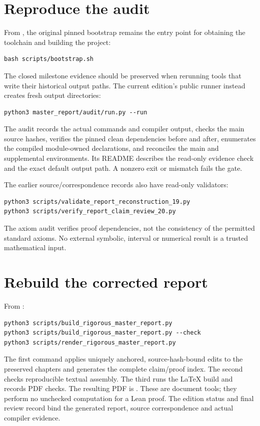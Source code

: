 

\section{Reproduce the audit}\label{reproduce-the-audit}

From , the original pinned bootstrap remains the entry point for obtaining the toolchain and building the project:
\begin{verbatim}
bash scripts/bootstrap.sh
\end{verbatim}
The closed milestone evidence should be preserved when rerunning tools that write their historical output paths. The current edition's public runner instead creates fresh output directories:
\begin{verbatim}
python3 master_report/audit/run.py --run
\end{verbatim}
The audit records the actual commands and compiler output, checks the main source hashes, verifies the pinned clean dependencies before and after, enumerates the compiled module-owned declarations, and reconciles the main and supplemental environments. Its README describes the read-only evidence check and the exact default output path. A nonzero exit or mismatch fails the gate.

The earlier source/correspondence records also have read-only validators:
\begin{verbatim}
python3 scripts/validate_report_reconstruction_19.py
python3 scripts/verify_report_claim_review_20.py
\end{verbatim}
The axiom audit verifies proof dependencies, not the consistency of the permitted standard axioms. No external symbolic, interval or numerical result is a trusted mathematical input.



\section{Rebuild the corrected report}\label{rebuild-the-report}

From :
\begin{verbatim}
python3 scripts/build_rigorous_master_report.py
python3 scripts/build_rigorous_master_report.py --check
python3 scripts/render_rigorous_master_report.py
\end{verbatim}
The first command applies uniquely anchored, source-hash-bound edits to the preserved chapters and generates the complete claim/proof index. The second checks reproducible textual assembly. The third runs the LaTeX build and records PDF checks. The resulting PDF is . These are document tools; they perform no unchecked computation for a Lean proof. The edition status and final review record bind the generated report, source correspondence and actual compiler evidence.


